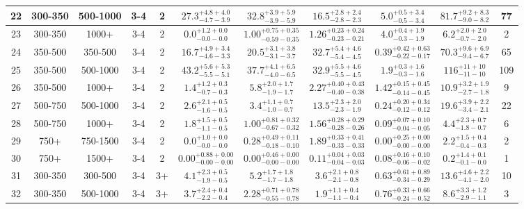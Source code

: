 \documentclass[11pt, oneside]{article}
\begin{document}
\begin{table}
{\begin{tabular}{ |c|c|c|c|c||c|c|c|c||c|c| }
22 & 300-350 & 500-1000 & 3-4 & 2 & $27.3^{+4.8+4.0}_{-4.7-3.9}$ & $32.8^{+3.9+5.9}_{-3.9-5.9}$ & $16.5^{+2.8+2.4}_{-2.8-2.3}$ & $5.0^{+0.5+3.4}_{-0.5-3.4}$ & $81.7^{+9.2+8.3}_{-9.0-8.2}$ & 77 \\ \hline
23 & 300-350 & 1000+ & 3-4 & 2 & $0.0^{+1.2+0.0}_{-0.0-0.0}$ & $1.00^{+0.75+0.35}_{-0.59-0.35}$ & $1.26^{+0.23+0.24}_{-0.23-0.21}$ & $4.0^{+0.4+1.9}_{-0.3-1.9}$ & $6.2^{+2.0+2.0}_{-0.7-2.0}$ & 2 \\ \hline
24 & 350-500 & 350-500 & 3-4 & 2 & $16.7^{+4.9+3.4}_{-4.6-3.3}$ & $20.5^{+3.1+3.8}_{-3.1-3.7}$ & $32.7^{+5.4+4.6}_{-5.4-4.5}$ & $0.39^{+0.42+0.63}_{-0.22-0.17}$ & $70.3^{+9.6+6.9}_{-9.4-6.7}$ & 65 \\ \hline
25 & 350-500 & 500-1000 & 3-4 & 2 & $43.2^{+5.6+5.3}_{-5.5-5.1}$ & $37.7^{+4.1+6.5}_{-4.0-6.5}$ & $32.9^{+5.5+4.6}_{-5.5-4.5}$ & $1.9^{+0.3+1.6}_{-0.3-1.6}$ & $116^{+11+10}_{-11-10}$ & 109 \\ \hline
26 & 350-500 & 1000+ & 3-4 & 2 & $1.4^{+1.2+0.3}_{-0.7-0.3}$ & $5.8^{+2.0+1.7}_{-1.9-1.7}$ & $2.27^{+0.40+0.43}_{-0.40-0.38}$ & $1.42^{+0.15+0.45}_{-0.14-0.45}$ & $10.9^{+3.2+1.9}_{-2.7-1.8}$ & 9 \\ \hline
27 & 500-750 & 500-1000 & 3-4 & 2 & $2.6^{+2.1+0.5}_{-1.6-0.5}$ & $3.4^{+1.1+0.7}_{-1.0-0.7}$ & $13.5^{+2.3+2.0}_{-2.3-1.9}$ & $0.24^{+0.20+0.34}_{-0.12-0.12}$ & $19.6^{+3.9+2.2}_{-3.4-2.1}$ & 22 \\ \hline
28 & 500-750 & 1000+ & 3-4 & 2 & $1.8^{+1.5+0.5}_{-1.1-0.5}$ & $1.00^{+0.81+0.32}_{-0.67-0.32}$ & $1.56^{+0.28+0.29}_{-0.28-0.26}$ & $0.09^{+0.07+0.10}_{-0.04-0.05}$ & $4.4^{+2.3+0.7}_{-1.8-0.7}$ & 6 \\ \hline
29 & 750+ & 750-1500 & 3-4 & 2 & $0.0^{+1.0+0.0}_{-0.0-0.0}$ & $0.28^{+0.49+0.11}_{-0.18-0.10}$ & $1.89^{+0.33+0.41}_{-0.33-0.33}$ & $0.00^{+0.25+0.00}_{-0.00-0.00}$ & $2.2^{+1.5+0.4}_{-0.4-0.3}$ & 2 \\ \hline
30 & 750+ & 1500+ & 3-4 & 2 & $0.00^{+0.88+0.00}_{-0.00-0.00}$ & $0.00^{+0.46+0.00}_{-0.00-0.00}$ & $0.11^{+0.04+0.03}_{-0.04-0.03}$ & $0.08^{+0.16+0.10}_{-0.06-0.02}$ & $0.2^{+1.4+0.1}_{-0.1-0.0}$ & 1 \\ \hline
31 & 300-350 & 300-500 & 3-4 & 3+ & $4.1^{+2.3+0.5}_{-1.9-0.5}$ & $5.2^{+1.7+1.8}_{-1.7-1.8}$ & $3.6^{+2.1+0.8}_{-2.1-0.8}$ & $0.63^{+0.61+0.89}_{-0.34-0.29}$ & $13.6^{+4.6+2.2}_{-4.1-2.0}$ & 10 \\ \hline
32 & 300-350 & 500-1000 & 3-4 & 3+ & $3.7^{+2.4+0.4}_{-2.2-0.4}$ & $2.28^{+0.71+0.78}_{-0.55-0.78}$ & $1.9^{+1.1+0.4}_{-1.1-0.4}$ & $0.76^{+0.33+0.66}_{-0.24-0.52}$ & $8.6^{+3.3+1.2}_{-2.9-1.1}$ & 3 \\ \hline

\end{tabular}}
\end{table}
\end{document}
